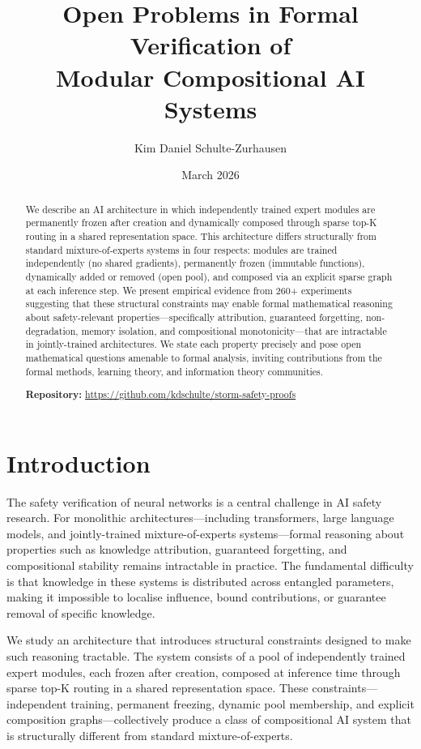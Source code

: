 \documentclass[11pt,a4paper]{article}
\title{Open Problems in Formal Verification of\\Modular Compositional AI Systems}
\author[1]{Kim Daniel Schulte-Zurhausen}
\affil[1]{Modulith Research CIC, London, UK\\
\texttt{research@modulith.ai}}
\date{March 2026}
\begin{document}
\maketitle

\begin{abstract}
We describe an AI architecture in which independently trained expert modules are permanently frozen after creation and dynamically composed through sparse top-K routing in a shared representation space.
This architecture differs structurally from standard mixture-of-experts systems in four respects: modules are trained independently (no shared gradients), permanently frozen (immutable functions), dynamically added or removed (open pool), and composed via an explicit sparse graph at each inference step.
We present empirical evidence from 260+ experiments suggesting that these structural constraints may enable formal mathematical reasoning about safety-relevant properties---specifically attribution, guaranteed forgetting, non-degradation, memory isolation, and compositional monotonicity---that are intractable in jointly-trained architectures.
We state each property precisely and pose open mathematical questions amenable to formal analysis, inviting contributions from the formal methods, learning theory, and information theory communities.

\medskip
\noindent\textbf{Repository:} \url{https://github.com/kdschulte/storm-safety-proofs}
\end{abstract}

\section{Introduction}
\label{sec:intro}

The safety verification of neural networks is a central challenge in AI safety research.
For monolithic architectures---including transformers, large language models, and jointly-trained mixture-of-experts systems---formal reasoning about properties such as knowledge attribution, guaranteed forgetting, and compositional stability remains intractable in practice.
The fundamental difficulty is that knowledge in these systems is distributed across entangled parameters, making it impossible to localise influence, bound contributions, or guarantee removal of specific knowledge.

We study an architecture that introduces structural constraints designed to make such reasoning tractable.
The system consists of a pool of independently trained expert modules, each frozen after creation, composed at inference time through sparse top-K routing in a shared representation space.
These constraints---independent training, permanent freezing, dynamic pool membership, and explicit composition graphs---collectively produce a class of compositional AI system that is structurally different from standard mixture-of-experts.
\end{document}

